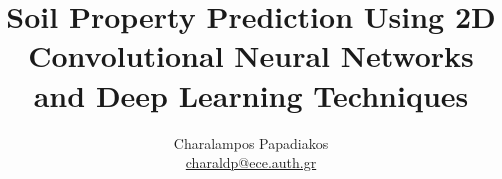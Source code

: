 \documentclass[a4paper,12pt]{report}
\def\tl{\textlatin}
\begin{document}


\title{\tl{Soil Property Prediction Using 2D Convolutional Neural Networks and Deep Learning Techniques}}
\author{\tl{Charalampos Papadiakos} \\
\href{mailto:charaldp@ece.auth.gr}{\tl{charaldp@ece.auth.gr}}}
\maketitle

\tableofcontents
\listoffigures
\listoftables








\appendix





\end{document}
